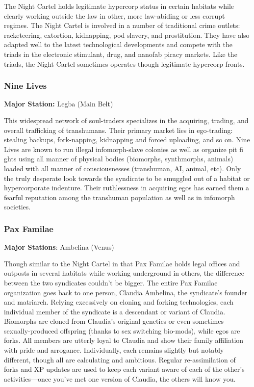The Night Cartel holds legitimate hypercorp status in certain habitats while clearly working outside the law in other, more law-abiding or less corrupt regimes. The Night Cartel is involved in a number of traditional crime outlets: racketeering, extortion, kidnapping, pod slavery, and prostitution. They have also adapted well to the latest technological developments and compete with the triads in the electronic stimulant, drug, and nanofab piracy markets. Like the triads, the Night Cartel sometimes operates though legitimate hypercorp fronts. 

\subsubsection{Nine Lives}
\label{sec:nine-lives} 

\textbf{Major Station:} Legba (Main Belt) 

This widespread network of soul-traders specializes in the acquiring, trading, and overall trafficking of transhumans. Their primary market lies in ego-trading: stealing backups, fork-napping, kidnapping and forced uploading, and so on. Nine Lives are known to run illegal infomorph-slave colonies as well as organize pit fi ghts using all manner of physical bodies (biomorphs, synthmorphs, animals) loaded with all manner of consciousnesses (transhuman, AI, animal, etc). Only the truly desperate look towards the syndicate to be smuggled out of a habitat or hypercorporate indenture. Their ruthlessness in acquiring egos has earned them a fearful reputation among the transhuman population as well as in infomorph societies.

\subsubsection{Pax Familae}
\label{sec:pax-familae} 

\textbf{Major Stations}: Ambelina (Venus) 

Though similar to the Night Cartel in that Pax Familae holds legal offices and outposts in several habitats while working underground in others, the difference between the two syndicates couldn't be bigger. The entire Pax Familae organization goes back to one person, Claudia Ambelina, the syndicate's founder and matriarch. Relying excessively on cloning and forking technologies, each individual member of the syndicate is a descendant or variant of Claudia. Biomorphs are cloned from Claudia's original genetics or even sometimes sexually-produced offspring (thanks to sex switching bio-mods), while egos are forks. All members are utterly loyal to Claudia and show their family affiliation with pride and arrogance. Individually, each remains slightly but notably different, though all are calculating and ambitious. Regular re-assimilation of forks and XP updates are used to keep each variant aware of each of the other's activities—once you've met one version of Claudia, the others will know you. 

